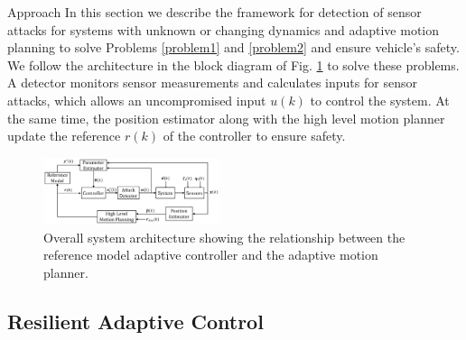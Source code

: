 
\begin{section}{Approach}
\label{sec:approach}
In this section we describe the framework for detection of sensor attacks for systems with unknown or changing dynamics and adaptive motion planning to solve Problems \ref{problem1} and \ref{problem2} and ensure vehicle's safety. We follow the architecture in the block diagram of Fig. \ref{fig:system_arch} to solve these problems. A detector monitors sensor measurements and calculates inputs for sensor attacks, which allows an uncompromised input $u(k)$ to control the system. At the same time, the position estimator along with the high level motion planner update the reference $r(k)$ of the controller to ensure safety.

\begin{figure}[ht!]
\vspace{1pt}
\centering
\includegraphics[width=0.46\textwidth]{sys_arch.png}
\caption{Overall system architecture showing the relationship between the reference model adaptive controller and the adaptive motion planner.}
\label{fig:system_arch}
\end{figure}

\subsection{Resilient Adaptive Control}
\label{sec:Res_adapt_control}


\end{section}
